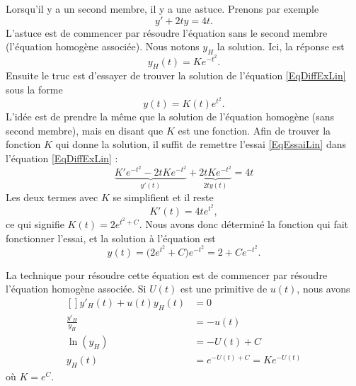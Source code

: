 Lorsqu'il y a un second membre, il y a une astuce. Prenons par exemple
\begin{equation}		\label{EqDiffExLin}
	y'+2ty=4t.
\end{equation}
L'astuce est de commencer par résoudre l'équation sans le second membre (l'équation homogène associée). Nous notons $y_H$ la solution. Ici, la réponse est
\begin{equation}
	y_H(t)=K e^{-t^2}.
\end{equation}
Ensuite le truc est d'essayer de trouver la solution de l'équation \eqref{EqDiffExLin} sous la forme
\begin{equation}		\label{EqEssaiLin}
	y(t)=K(t) e^{t^2}.
\end{equation}
L'idée est de prendre la même que la solution de l'équation homogène (sans second membre), mais en disant que $K$ est une fonction. Afin de trouver la fonction $K$ qui donne la solution, il suffit de remettre l'essai \eqref{EqEssaiLin} dans l'équation \eqref{EqDiffExLin} :
\begin{equation}
	\underbrace{K' e^{-t^2}-2tK e^{-t^2}}_{y'(t)}+\underbrace{2tK e^{-t^2}}_{2ty(t)}=4t
\end{equation}
Les deux termes avec $K$ se simplifient et il reste
\begin{equation}
	K'(t)=4t e^{t^2},
\end{equation}
ce qui signifie $K(t)=2 e^{t^2+C}$. Nous avons donc déterminé la fonction qui fait fonctionner l'essai, et la solution à l'équation est
\begin{equation}
	y(t)=\big( 2 e^{t^2}+C \big) e^{-t^2}=2+C e^{-t^2}.
\end{equation}


La technique pour résoudre cette équation est de commencer par résoudre l'équation homogène associée. Si $U(t)$ est une primitive de $u(t)$, nous avons
\begin{equation}
	\begin{aligned}[]
		y'_H(t)+u(t)y_H(t)&=0\\
		\frac{ y'_H }{ y_H }&=-u(t)\\
		\ln(y_H)&=-U(t)+C\\
		y_H(t)&= e^{-U(t)+C}=K e^{-U(t)}
	\end{aligned}
\end{equation}
où $K= e^{C}$.

